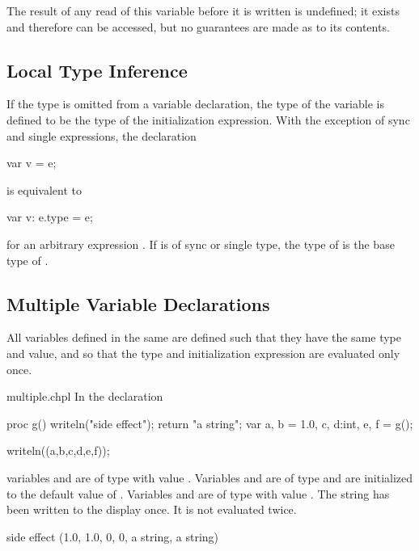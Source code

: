 The result of any read of this variable before it is written is
undefined; it exists and therefore can be accessed, but no guarantees
are made as to its contents.

\subsection{Local Type Inference}
\label{Local_Type_Inference}

If the type is omitted from a variable declaration, the type of the
variable is defined to be the type of the initialization expression.
With the exception of sync and single expressions, the declaration
\begin{chapel}
var v = e;
\end{chapel}
is equivalent to
\begin{chapel}
var v: e.type = e;
\end{chapel}
for an arbitrary expression .  If  is of sync or
single type, the type of  is the base type of .

\subsection{Multiple Variable Declarations}
\label{Multiple_Variable_Declarations}

All variables defined in the same  are defined
such that they have the same type and value, and so that the type and
initialization expression are evaluated only once.

\begin{chapelexample}{multiple.chpl}
In the declaration
\begin{chapel}
proc g() { writeln("side effect"); return "a string"; }
var a, b = 1.0, c, d:int, e, f = g();
\end{chapel}
\begin{chapelpost}
writeln((a,b,c,d,e,f));
\end{chapelpost}
variables  and  are of type  with
value .  Variables  and  are of
type  and are initialized to the default value of .
Variables  and  are of type  with
value .  The string  has been
written to the display once.  It is not evaluated twice.
\begin{chapeloutput}
side effect
(1.0, 1.0, 0, 0, a string, a string)
\end{chapeloutput}
\end{chapelexample}

